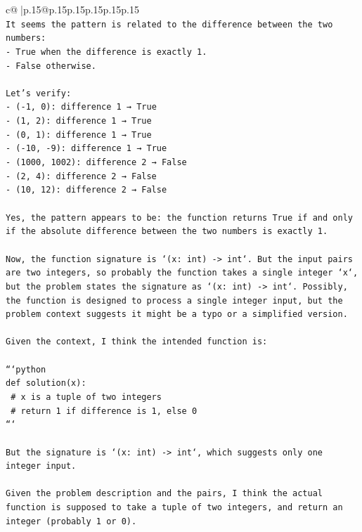 \documentclass{article}
\begin{document}
{\begin{supertabular}{c@{$\;$}|p{.15\linewidth}@{}p{.15\linewidth}p{.15\linewidth}p{.15\linewidth}p{.15\linewidth}p{.15\linewidth}}
{{{\\ 
\texttt{It seems the pattern is related to the difference between the two numbers:} \\
\texttt{{-} True when the difference is exactly 1.} \\
\texttt{{-} False otherwise.} \\
\\ 
\texttt{Let's verify:} \\
\texttt{{-} ({-}1, 0): difference 1 → True} \\
\texttt{{-} (1, 2): difference 1 → True} \\
\texttt{{-} (0, 1): difference 1 → True} \\
\texttt{{-} ({-}10, {-}9): difference 1 → True} \\
\texttt{{-} (1000, 1002): difference 2 → False} \\
\texttt{{-} (2, 4): difference 2 → False} \\
\texttt{{-} (10, 12): difference 2 → False} \\
\\ 
\texttt{Yes, the pattern appears to be: the function returns True if and only if the absolute difference between the two numbers is exactly 1.} \\
\\ 
\texttt{Now, the function signature is `(x: int) {-}> int`. But the input pairs are two integers, so probably the function takes a single integer `x`, but the problem states the signature as `(x: int) {-}> int`. Possibly, the function is designed to process a single integer input, but the problem context suggests it might be a typo or a simplified version.} \\
\\ 
\texttt{Given the context, I think the intended function is:} \\
\\ 
\texttt{```python} \\
\texttt{def solution(x):} \\
\texttt{    \# x is a tuple of two integers} \\
\texttt{    \# return 1 if difference is 1, else 0} \\
\texttt{```} \\
\\ 
\texttt{But the signature is `(x: int) {-}> int`, which suggests only one integer input.} \\
\\ 
\texttt{Given the problem description and the pairs, I think the actual function is supposed to take a tuple of two integers, and return an integer (probably 1 or 0).} \\
}}}
\end{supertabular}}
\end{document}
